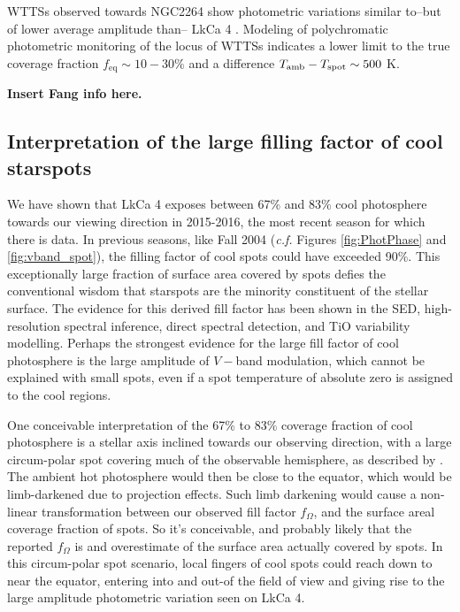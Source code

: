 \documentclass[twocolumn]{emulateapj}%
\begin{document}
WTTSs observed towards NGC2264 show photometric variations similar to--but of lower average amplitude than-- LkCa 4 \citep{venuti15}.  Modeling of polychromatic photometric monitoring of the locus of WTTSs indicates a lower limit to the true coverage fraction $f_{\mathrm{eq}}\sim10-30\%$ and a difference $T_\textrm{amb}-T_\textrm{spot}\sim500$ K.

\textbf{Insert Fang info here.}



\subsection{Interpretation of the large filling factor of cool starspots}
We have shown that LkCa 4 exposes between 67\% and 83\% cool photosphere towards our viewing direction in 2015-2016, the most recent season for which there is data.  In previous seasons, like Fall 2004 (\emph{c.f.} Figures \ref{fig:PhotPhase} and \ref{fig:vband_spot}), the filling factor of cool spots could have exceeded 90\%.  This exceptionally large fraction of surface area covered by spots defies the conventional wisdom that starspots are the minority constituent of the stellar surface.  The evidence for this derived fill factor has been shown in the SED, high-resolution spectral inference, direct spectral detection, and TiO variability modelling.  Perhaps the strongest evidence for the large fill factor of cool photosphere is the large amplitude of $V-$band modulation, which cannot be explained with small spots, even if a spot temperature of absolute zero is assigned to the cool regions.

One conceivable interpretation of the 67\% to 83\% coverage fraction of cool photosphere is a stellar axis inclined towards our observing direction, with a large circum-polar spot covering much of the observable hemisphere, as described by \citet{donati14}.  The ambient hot photosphere would then be close to the equator, which would be limb-darkened due to projection effects.  Such limb darkening would cause a non-linear transformation between our observed fill factor $f_{\Omega}$, and the surface areal coverage fraction of spots.  So it's conceivable, and probably likely that the reported $f_{\Omega}$ is and overestimate of the surface area actually covered by spots.  In this circum-polar spot scenario, local fingers of cool spots could reach down to near the equator, entering into and out-of the field of view and giving rise to the large amplitude photometric variation seen on LkCa 4.  
\end{document}
